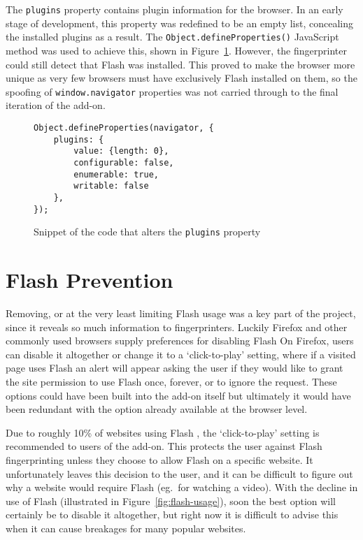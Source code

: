 The \texttt{plugins} property contains plugin information for the browser.
In an early stage of development, this property was redefined to be an empty list, concealing the installed plugins as a result.
The \texttt{Object.defineProperties()} JavaScript method was used to achieve this, shown in Figure~\ref{lst:plugins}.
However, the fingerprinter could still detect that Flash was installed.
This proved to make the browser more unique as very few browsers must have exclusively Flash installed on them, so the spoofing of \texttt{window.navigator} properties was not carried through to the final iteration of the add-on.

\begin{figure}[h]
\begin{lstlisting}
Object.defineProperties(navigator, {
    plugins: {
        value: {length: 0},
        configurable: false,
        enumerable: true,
        writable: false
    },
});
\end{lstlisting}
\caption{Snippet of the code that alters the \texttt{plugins} property}
\label{lst:plugins}
\end{figure}

\section{Flash Prevention}

Removing, or at the very least limiting Flash usage was a key part of the project, since it reveals so much information to fingerprinters.
Luckily Firefox and other commonly used browsers supply preferences for disabling Flash
On Firefox, users can disable it altogether or change it to a `click-to-play' setting, where if a visited page uses Flash an alert will appear asking the user if they would like to grant the site permission to use Flash once, forever, or to ignore the request.
These options could have been built into the add-on itself but ultimately it would have been redundant with the option already available at the browser level.

Due to roughly 10\% of websites using Flash \citep{flash-usage}, the `click-to-play' setting is recommended to users of the add-on.
This protects the user against Flash fingerprinting unless they choose to allow Flash on a specific website.
It unfortunately leaves this decision to the user, and it can be difficult to figure out why a website would require Flash (eg.\ for watching a video).
With the decline in use of Flash (illustrated in Figure~\ref{fig:flash-usage}), soon the best option will certainly be to disable it altogether, but right now it is difficult to advise this when it can cause breakages for many popular websites.

